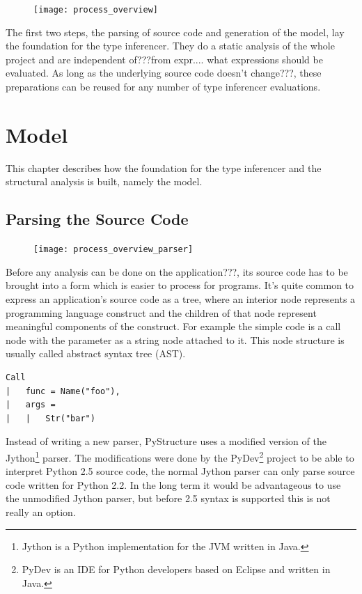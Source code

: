 \documentclass[12pt,halfparskip,DIV11,BCOR10mm]{scrreprt}
\begin{document}
\begin{figure}[h!]
 \centering
 \texttt{[image: process\_overview]}
 \label{fig:process_overview}
\end{figure}

The first two steps, the parsing of source code and generation of the model, lay the foundation for the type inferencer. They do a static analysis of the whole project and are independent of???from expr.... what expressions should be evaluated. As long as the underlying source code doesn't change???, these preparations can be reused for any number of type inferencer evaluations.



\chapter{Model}

This chapter describes how the foundation for the type inferencer and the structural analysis is built, namely the model.

\section{Parsing the Source Code}

\begin{figure}
    \vspace{-0.6cm}
    \texttt{[image: process\_overview\_parser]}
\end{figure}

Before any analysis can be done on the application???, its source code has to be brought into a form which is easier to process for programs. It's quite common to express an application's source code as a tree, where an interior node represents a programming language construct and the children of that node represent meaningful components of the construct. For example the simple code  is a call node with the parameter as a string node attached to it. This node structure is usually called abstract syntax tree (AST).

\begin{lstlisting}
Call
|   func = Name("foo"),
|   args = 
|   |   Str("bar")
\end{lstlisting}

Instead of writing a new parser, PyStructure uses a modified version of the Jython\footnote{Jython is a Python implementation for the JVM written in Java.} parser. The modifications were done by the PyDev\footnote{PyDev is an IDE for Python developers based on Eclipse and written in Java.} project to be able to interpret Python 2.5 source code, the normal Jython parser can only parse source code written for Python 2.2. In the long term it would be advantageous to use the unmodified Jython parser, but before 2.5 syntax is supported this is not really an option.
\end{document}
